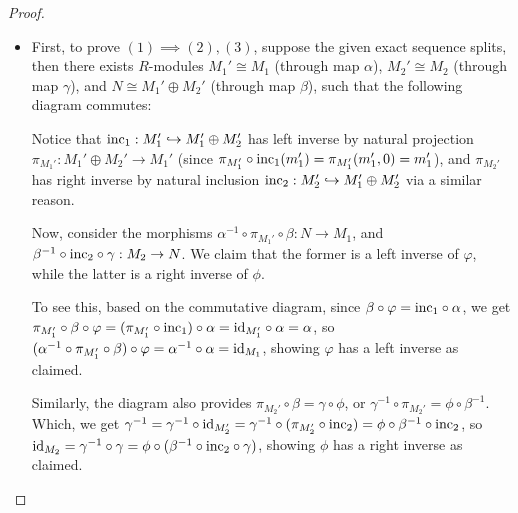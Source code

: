 \documentclass[x11names,reqno,12pt]{extarticle}
\newcommand{\id}{\textmd{id}}
\begin{document}
\begin{proof}

\hfill

    \begin{itemize}
        \item First, to prove $(1)\implies (2),(3)$,  suppose the given exact sequence splits, then there exists $R$-modules $M_1'\cong M_1$ (through map $\alpha$), $M_2'\cong M_2$ (through map $\gamma$), and $N\cong M_1'\oplus M_2'$ (through map $\beta$), such that the following diagram commutes:
        \begin{center}
        \end{center}
        Notice that $\textmd{inc}_1:M_1'\hookrightarrow M_1'\oplus M_2'$ has left inverse by natural projection $\pi_{M_1'}:M_1'\oplus M_2' \rightarrow M_1'$ (since $\pi_{M_1'}\circ \textmd{inc}_1(m_1') = \pi_{M_1'}(m_1',0) = m_1' $), and $\pi_{M_2'}$ has right inverse by natural inclusion $\textmd{inc}_2:M_2'\hookrightarrow M_1'\oplus M_2'$ via a similar reason.

        \hfill

        Now, consider the morphisms  $\alpha^{-1}\circ \pi_{M_1'}\circ \beta:N \rightarrow M_1$, and $\beta^{-1}\circ \textmd{inc}_2\circ \gamma:M_2 \rightarrow N$. We claim that the former is a left inverse of $\varphi$, while the latter is a right inverse of $\phi$.

        To see this, based on the commutative diagram, since $\beta\circ \varphi = \textmd{inc}_1\circ \alpha$, we get $\pi_{M_1'}\circ \beta \circ \varphi = (\pi_{M_1'}\circ \textmd{inc}_1)\circ \alpha = \id_{M_1'}\circ \alpha = \alpha$, so $(\alpha^{-1}\circ \pi_{M_1'}\circ \beta)\circ \varphi = \alpha^{-1}\circ \alpha = \id_{M_1}$, showing $\varphi$ has a left inverse as claimed.

        Similarly, the diagram also provides $\pi_{M_2'}\circ \beta = \gamma\circ \phi$, or $\gamma^{-1}\circ \pi_{M_2'}=\phi\circ \beta^{-1}$. Which, we get $\gamma^{-1} = \gamma^{-1}\circ \id_{M_2'} = \gamma^{-1}\circ (\pi_{M_2'}\circ \textmd{inc}_2) = \phi \circ \beta^{-1}\circ \textmd{inc}_2$, so $\id_{M_2} = \gamma^{-1}\circ \gamma = \phi\circ(\beta^{-1}\circ \textmd{inc}_2\circ \gamma)$, showing $\phi$ has a right inverse as claimed. 


\end{itemize}
\end{proof}
\end{document}
